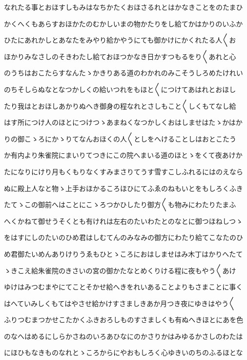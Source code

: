 \documentclass[a4paper,11pt,landscape]{ltjtarticle}
\begin{document}
なれたる事とおほすしもみはなちかたくおほさるれとはかなきことをのたまひ
\par\medskip
かくへくもあらすおほかたのむかしいまの物かたりをし給てかはかりのいふか
\par\medskip
ひたにあれかしとあなたをみやり給かやうにても御かけにかくれたる人〱お
\par\medskip
ほかりみなさしのそきわたし給ておほつかなき日かすつもるをり〱あれと心
\par\medskip
のうちはおこたらすなんたゝかきりある道のわかれのみこそうしろめたけれい
\par\medskip
のちそしらぬなとなつかしくの給いつれをもほと〱につけてあはれとおほし
\par\medskip
たり我はとおほしあかりぬへき御身の程なれとさしもこと〱しくもてなし給
\par\medskip
はす所につけ人のほとにつけつゝあまねくなつかしくおはしませはたゝかはか
\par\medskip
りの御こゝろにかゝりてなんおほくの人〱としをへけることしはおとこたう
\par\medskip
か有内より朱雀院にまいりてつきにこの院へまいる道のほとゝをくて夜あけか
\par\medskip
たになりにけり月もくもりなくすみまさりてうす雪すこしふれるにはのえなら
\par\medskip
ぬに殿上人なと物ゝ上手おほかるころほひにてふゑのねもいとをもしろくふき
\par\medskip
たてゝこの御前へはことにこゝろつかひしたり御方〱も物みにわたりたまふ
\par\medskip
へくかねて御せうそくとも有けれは左右のたいわたとのなとに御つほねしつゝ
\par\medskip
をはすにしのたいのひめ君はしむてんのみなみの御方にわたり給てこなたのひ
\par\medskip
め君御たいめんありけりうゑもひとゝころにおはしませはみ木丁はかりへたて
\par\medskip
ゝきこえ給朱雀院のきさいの宮の御かたなとめくりける程に夜もやう〱あけ
\par\medskip
ゆけはみつむまやにてことそかせ給へきをれいあることよりもさまことに事く
\par\medskip
はへていみしくもてはやさせ給かけすさましきあか月つき夜にゆきはやう〱
\par\medskip
ふりつむまつかせこたかくふきおろしものすさましくも有ぬへきほとにあを色
\par\medskip
のなへはめるにしらかさねのいろあひなにのかさりかはみゆるかさしのわたは
\par\medskip
にほひもなきものなれとゝころからにやおもしろく心ゆきいのちのふるほとな
\end{document}

